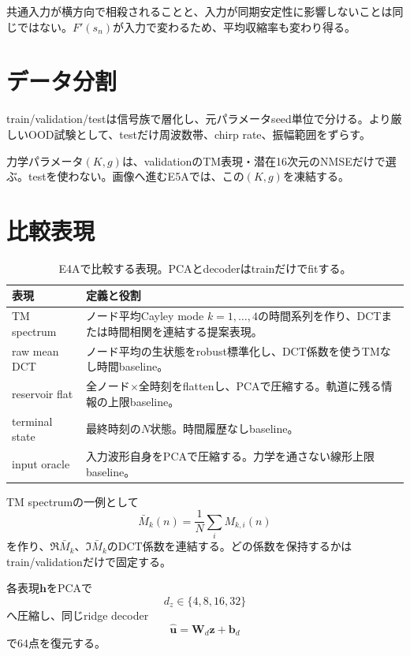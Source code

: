 \documentclass[a4paper,11pt,oneside,openany]{ltjsbook}
\newcommand{\vect}[1]{\bm{#1}}
\newcommand{\mat}[1]{\bm{#1}}
\begin{document}
\begin{cautionbox}
共通入力が横方向で相殺されることと、入力が同期安定性に影響しないことは同じではない。\(F'(s_n)\)が入力で変わるため、平均収縮率も変わり得る。
\end{cautionbox}

\section{データ分割}

train/validation/testは信号族で層化し、元パラメータseed単位で分ける。より厳しいOOD試験として、testだけ周波数帯、chirp rate、振幅範囲をずらす。

力学パラメータ\((K,g)\)は、validationのTM表現・潜在16次元のNMSEだけで選ぶ。testを使わない。画像へ進むE5Aでは、この\((K,g)\)を凍結する。

\section{比較表現}

\begin{table}[htbp]
\centering
\caption{E4Aで比較する表現。PCAとdecoderはtrainだけでfitする。}
\label{tab:e4_representations}
\begin{tabularx}{\textwidth}{p{35mm}X}
\toprule
表現 & 定義と役割 \\
\midrule
TM spectrum & ノード平均Cayley mode \(k=1,\dots,4\)の時間系列を作り、DCTまたは時間相関を連結する提案表現。\\
raw mean DCT & ノード平均の生状態をrobust標準化し、DCT係数を使うTMなし時間baseline。\\
reservoir flat & 全ノード\(\times\)全時刻をflattenし、PCAで圧縮する。軌道に残る情報の上限baseline。\\
terminal state & 最終時刻の\(N\)状態。時間履歴なしbaseline。\\
input oracle & 入力波形自身をPCAで圧縮する。力学を通さない線形上限baseline。\\
\bottomrule
\end{tabularx}
\end{table}

TM spectrumの一例として
\begin{equation}
  \bar M_k(n)=\frac1N\sum_iM_{k,i}(n)
  \label{eq:e4_mean_tm_mode}
\end{equation}
を作り、\(\Re\bar M_k\)、\(\Im\bar M_k\)のDCT係数を連結する。どの係数を保持するかはtrain/validationだけで固定する。

各表現\(\vect h\)をPCAで
\begin{equation}
  d_z\in\{4,8,16,32\}
  \label{eq:e4_latent_dimensions}
\end{equation}
へ圧縮し、同じridge decoder
\begin{equation}
  \widehat{\vect u}
  =\mat W_d\vect z+\vect b_d
  \label{eq:e4_ridge_decoder}
\end{equation}
で64点を復元する。
\end{document}
